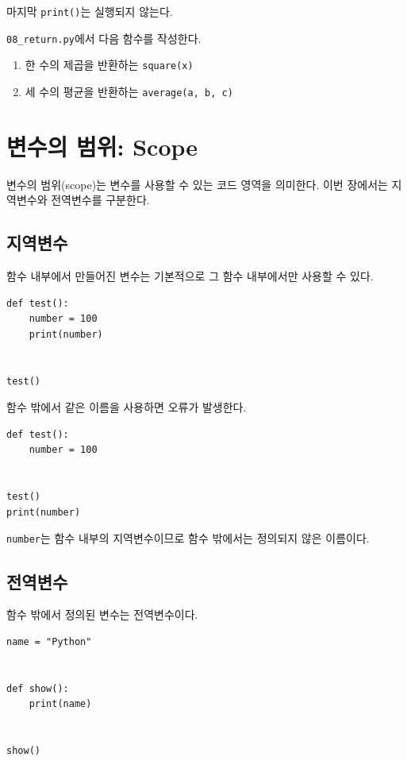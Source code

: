 \documentclass[11pt,a4paper]{article}
\begin{document}
마지막 \texttt{print()}는 실행되지 않는다.

\begin{practicebox}
\texttt{08\_return.py}에서 다음 함수를 작성한다.
\begin{enumerate}
    \item 한 수의 제곱을 반환하는 \texttt{square(x)}
    \item 세 수의 평균을 반환하는 \texttt{average(a, b, c)}
\end{enumerate}
\end{practicebox}

\section{변수의 범위: Scope}

변수의 범위(scope)는 변수를 사용할 수 있는 코드 영역을 의미한다. 이번 장에서는 지역변수와 전역변수를 구분한다.

\subsection{지역변수}

함수 내부에서 만들어진 변수는 기본적으로 그 함수 내부에서만 사용할 수 있다.

\begin{lstlisting}
def test():
    number = 100
    print(number)


test()
\end{lstlisting}

함수 밖에서 같은 이름을 사용하면 오류가 발생한다.

\begin{lstlisting}
def test():
    number = 100


test()
print(number)
\end{lstlisting}

\texttt{number}는 함수 내부의 지역변수이므로 함수 밖에서는 정의되지 않은 이름이다.

\subsection{전역변수}

함수 밖에서 정의된 변수는 전역변수이다.

\begin{lstlisting}
name = "Python"


def show():
    print(name)


show()
\end{lstlisting}
\end{document}
